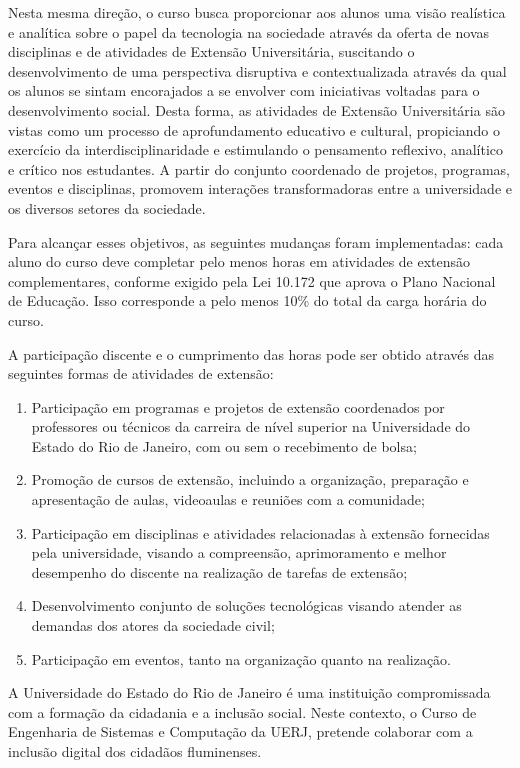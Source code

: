 Nesta mesma direção, o curso busca proporcionar aos alunos uma visão realística e analítica sobre o papel da tecnologia na sociedade através da oferta de novas disciplinas e de atividades de Extensão Universitária, suscitando o desenvolvimento de uma perspectiva disruptiva e contextualizada através da qual os alunos se sintam encorajados a se envolver com iniciativas voltadas para o desenvolvimento social. Desta forma, as atividades de Extensão Universitária são vistas como um processo de aprofundamento educativo e cultural, propiciando o exercício da interdisciplinaridade e estimulando o pensamento reflexivo, analítico e crítico nos estudantes. A partir do conjunto coordenado de projetos, programas, eventos e disciplinas, promovem interações transformadoras entre a universidade e os diversos setores da sociedade.

Para alcançar esses objetivos, as seguintes mudanças foram implementadas: cada aluno do curso deve completar pelo menos \hextensao horas em atividades de extensão complementares, conforme exigido pela Lei 10.172 que aprova o Plano Nacional de Educação. Isso corresponde a pelo menos 10\% do total da carga horária do curso.

A participação discente e o cumprimento das horas pode ser obtido através das seguintes formas de atividades de extensão:
\begin{enumerate}[I -]
    \item Participação em programas e projetos de extensão coordenados por professores ou técnicos da carreira de nível superior na Universidade do Estado do Rio de Janeiro, com ou sem o recebimento de bolsa;
    \item Promoção de cursos de extensão, incluindo a organização, preparação e apresentação de aulas, videoaulas e reuniões com a comunidade;
    \item Participação em disciplinas e atividades relacionadas à extensão fornecidas pela universidade, visando a compreensão, aprimoramento e melhor desempenho do discente na realização de tarefas de extensão;
    \item Desenvolvimento conjunto de soluções tecnológicas visando atender as demandas dos atores da sociedade civil;
    \item Participação em eventos, tanto na organização quanto na realização.
\end{enumerate}

A Universidade do Estado do Rio de Janeiro é uma instituição compromissada com a formação da cidadania e a inclusão social. Neste contexto, o Curso de Engenharia de Sistemas e Computação da UERJ, pretende colaborar com a inclusão digital dos cidadãos fluminenses.

